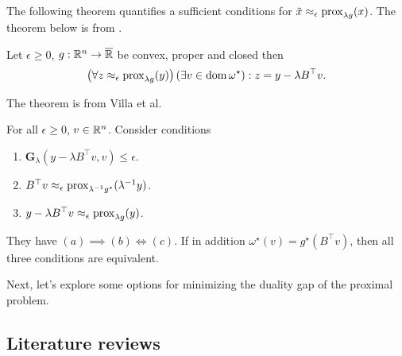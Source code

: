 \documentclass[12pt]{article}
\begin{document}
        The following theorem quantifies a sufficient conditions for $\tilde x \approx_\epsilon \operatorname{prox}_{\lambda g}(x)$. 
        The theorem below is from \cite[Proposition 2.2]{villa_accelerated_2013}. 
        \begin{theorem}\label{thm:primal-dual-trans}
            Let $\epsilon \ge 0$, $g:\mathbb R^n \rightarrow \overline {\mathbb R}$ be convex, proper and closed then 
            \begin{align*}
                \left(
                    \forall z \approx_\epsilon \operatorname{prox}_{\lambda g}(y) 
                \right)(\exists v \in \operatorname{dom} \omega^\star): z = y - \lambda B^\top v. 
            \end{align*}
        \end{theorem}
        The theorem is from Villa et al. \cite[Proposition 2.3]{villa_accelerated_2013}
        \begin{theorem}\label{thm:dlty-gap-inxt-pp}
            For all $\epsilon \ge 0$, $v \in \mathbb R^n$. 
            Consider conditions 
            \begin{enumerate}[nosep]
                \item $\mathbf G_\lambda(y - \lambda B^\top v, v) \le \epsilon$. 
                \item $B^\top v \approx_\epsilon \operatorname{prox}_{\lambda^{-1}g^\star}(\lambda^{-1}y)$. 
                \item $y - \lambda B^\top v \approx_{\epsilon} \operatorname{prox}_{\lambda g}(y)$. 
            \end{enumerate}
            They have $(a)\implies (b) \iff (c)$. 
            If in addition $\omega^\star(v) = g^\star(B^\top v)$, then all three conditions are equivalent. 
        \end{theorem}
        Next, let's explore some options for minimizing the duality gap of the proximal problem. 


    \subsection{Literature reviews}


\end{document}
